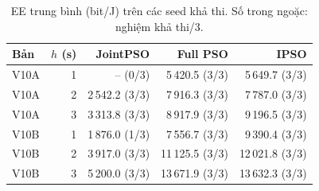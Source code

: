 \begin{table}
\centering
\renewcommand{\arraystretch}{1.16}
\setlength{\tabcolsep}{5pt}
\begin{tabular}{lrrrr}
\toprule
Bản & $h$ (s) & JointPSO & Full PSO & IPSO \\
\midrule
V10A & 1 & -- (0/3) & 5\,420.5 (3/3) & 5\,649.7 (3/3) \\
V10A & 2 & 2\,542.2 (3/3) & 7\,916.3 (3/3) & 7\,787.0 (3/3) \\
V10A & 3 & 3\,313.8 (3/3) & 8\,917.9 (3/3) & 9\,196.5 (3/3) \\
V10B & 1 & 1\,876.0 (1/3) & 7\,556.7 (3/3) & 9\,390.4 (3/3) \\
V10B & 2 & 3\,917.0 (3/3) & 11\,125.5 (3/3) & 12\,021.8 (3/3) \\
V10B & 3 & 5\,200.0 (3/3) & 13\,671.9 (3/3) & 13\,632.3 (3/3) \\
\bottomrule
\end{tabular}
\caption{EE trung bình (bit/J) trên các seed khả thi. Số trong ngoặc: nghiệm khả thi/3.}
\end{table}
